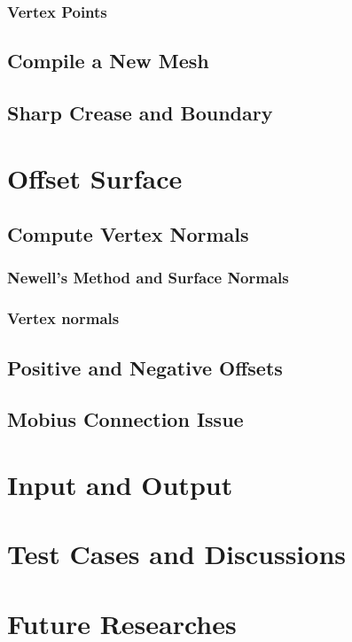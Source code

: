 \documentclass[12pt]{article}
\begin{document}
\subsubsection{Vertex Points}

\subsection{Compile a New Mesh}

\subsection{Sharp Crease and Boundary}

\section{Offset Surface} \label{sec:offset}

\subsection{Compute Vertex Normals}

\subsubsection{Newell's Method and Surface Normals}

\subsubsection{Vertex normals}

\subsection{Positive and Negative Offsets}

\subsection{Mobius Connection Issue}

\section{Input and Output}

\section{Test Cases and Discussions}

\section{Future Researches}
\end{document}

